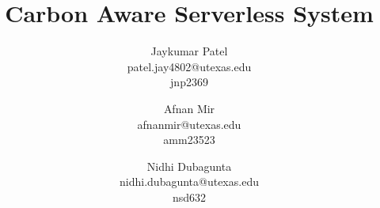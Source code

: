 \documentclass[times, 10pt,twocolumn]{article}
\begin{document}
\title{Carbon Aware Serverless System}

\author{Jaykumar Patel\\
patel.jay4802@utexas.edu\\
jnp2369\\
\and
Afnan Mir\\
afnanmir@utexas.edu\\
amm23523\\
\and
Nidhi Dubagunta\\
nidhi.dubagunta@utexas.edu \\
nsd632\\
}



\maketitle
\thispagestyle{empty}
\end{document}
